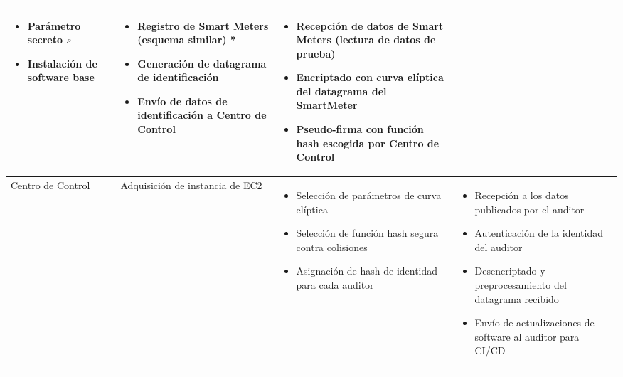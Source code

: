 \documentclass{article}
\begin{document}
\begin{table}[htbp]
{\begin{tabular}{| m{2cm} | m{3cm} | m{5cm} | m{9cm} |}
\begin{itemize}[noitemsep]
                        \item Parámetro secreto $s$
                        \item Instalación de software base
                    \end{itemize} &
                    \begin{itemize}[noitemsep]
                        \item Registro de Smart Meters (esquema similar) *
                        \item Generación de datagrama de identificación
                        \item Envío de datos de identificación a Centro de Control
                    \end{itemize} &
                    \begin{itemize}[noitemsep]
                        \item Recepción de datos de Smart Meters (lectura de datos de prueba)
                        \item Encriptado con curva elíptica del datagrama del SmartMeter
                        \item Pseudo-firma con función hash escogida por Centro de Control
                    \end{itemize} \\
                    \hline
                    Centro de Control &
                    Adquisición de instancia de EC2 &
                    \begin{itemize}[noitemsep]
                        \item Selección de parámetros de curva elíptica
                        \item Selección de función hash segura contra colisiones
                        \item Asignación de hash de identidad para cada auditor
                    \end{itemize} &
                    \begin{itemize}[noitemsep]
                        \item Recepción a los datos publicados por el auditor
                        \item Autenticación de la identidad del auditor
                        \item Desencriptado y preprocesamiento del datagrama recibido
                        \item Envío de actualizaciones de software al auditor para CI/CD

\end{itemize}
\end{tabular}}
\end{table}
\end{document}
